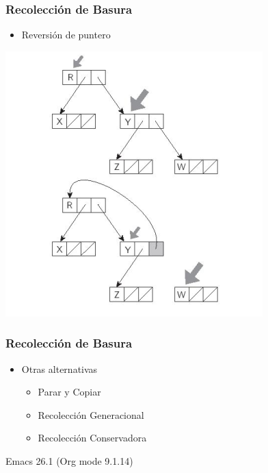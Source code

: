 \documentclass[11pt]{article}
\begin{document}
\subsubsection*{Recolección de Basura}
\label{sec:org3d766b2}
\begin{itemize}
\item Reversión de puntero
\end{itemize}

\begin{center}
\includegraphics[width=.9\linewidth]{reversepoint.png}
\end{center} 

\subsubsection*{Recolección de Basura}
\label{sec:orga1f97be}
\begin{itemize}
\item Otras alternativas
\begin{itemize}
\item Parar y Copiar
\item Recolección Generacional
\item Recolección Conservadora
\end{itemize}
\end{itemize}
Emacs 26.1 (Org mode 9.1.14)
\end{document}

